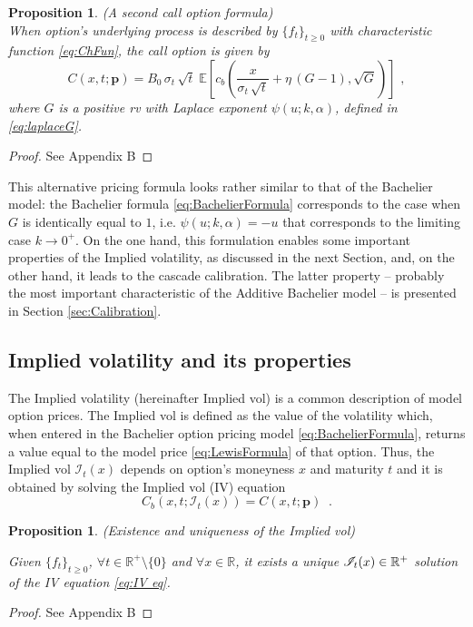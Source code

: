 \documentclass[12pt]{article}
\newtheorem{proposition}[theorem]{Proposition}
\theoremstyle{definition}
\theoremstyle{remark}
\numberwithin{theorem}{section}
\numberwithin{proposition}{section}
\numberwithin{lemma}{section}
\numberwithin{corollary}{section}
\numberwithin{definition}{section}
\numberwithin{remark}{section}
\numberwithin{example}{section}
\newcommand{\E}{\mathbb{E}}
\newcommand{\R}{\mathbb{R}}
\newcommand{\be}{\begin{equation}}
\newcommand{\en}{\end{equation}}
\begin{document}
\begin{proposition} {\rm (A second call option formula)} 
\label{prop:price} \\
When option's underlying process is described by $\{f_t \}_{t\geq 0}$ with 
characteristic function \eqref{eq:ChFun}, 
the call option is given by 
\be
C(x, t; \mathbf{p}) = B_0  \, \sigma_t \, \sqrt{ t}   \; 
\E \left[  c_b\left(  \frac{x}{ \sigma_t \, \sqrt{ t}} + \eta \, (G-1) , \sqrt{G} \right) \right]\,\,,
\label{eq:ModelPrice_Time}
\en
where $G$ is a positive rv with Laplace exponent $\psi(u; k, \alpha)$, defined in \eqref{eq:laplaceG}.
\end{proposition}
\begin{proof}
    See Appendix B
\end{proof}

This alternative pricing formula looks rather similar to that of the Bachelier model:
the Bachelier formula \eqref{eq:BachelierFormula} corresponds to the case when $G$ is identically equal to $1$, i.e. 
$\psi(u; k, \alpha) = -u$ that corresponds to the limiting case $k \to 0^+$.
On the one hand, this formulation enables some important properties of the Implied volatility, as discussed in the next Section, and, 
on the other hand, it leads to the cascade calibration. 
The latter property -- probably the most important characteristic of the Additive Bachelier model --
is presented in Section \ref{sec:Calibration}. 

\subsection{Implied volatility and its properties}

The Implied volatility (hereinafter Implied vol) is a common description of model option prices. 
The Implied vol is defined as the value of the volatility which, 
when entered in the Bachelier option pricing model \eqref{eq:BachelierFormula}, returns a value equal to the model price \eqref{eq:LewisFormula} of that option.  Thus,
the Implied vol $\mathcal{I}_t (x)$ depends on option's moneyness $x$ and 
maturity $t$ and it is obtained by solving the Implied vol (IV) 
equation
\be
C_b(x, t; \mathcal{I}_t (x)) = C(x, t; \mathbf{p}) \;\; .
\label{eq:IV eq}
\en

\begin{proposition} {\rm (Existence and uniqueness of the Implied vol)}

Given $\{f_t \}_{t\ge 0}$, $\forall {t} \in \R^+\setminus\{0\}$ and $\forall {x} \in \R$, 
it exists a unique ${\cal I}_t(x) \in \R^+$ solution of the IV equation \eqref{eq:IV eq}.
\label{pr:Existence}
\end{proposition}
\begin{proof}
    See Appendix B
\end{proof}
\end{document}
